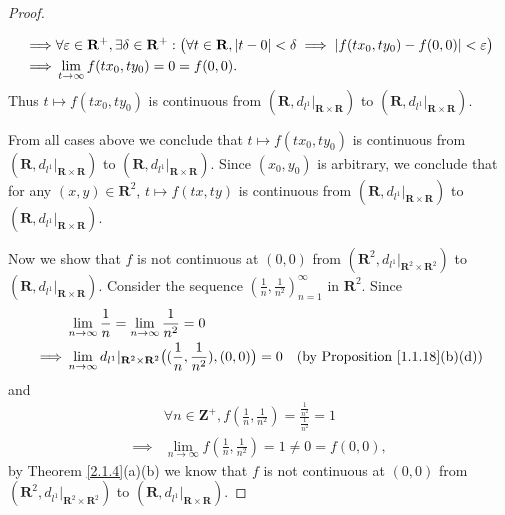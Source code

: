 \begin{proof}
\begin{itemize}
\begin{align*}
                  \implies & \forall \varepsilon \in \mathbf{R}^+, \exists \delta \in \mathbf{R}^+ : \big(\forall t \in \mathbf{R}, \abs*{t - 0} < \delta \implies \abs*{f(t x_0, t y_0) - f(0, 0)} < \varepsilon\big) \\
                  \implies & \lim_{t \to \infty} f(t x_0, t y_0) = 0 = f(0, 0).
              \end{align*}
              Thus \(t \mapsto f(t x_0, t y_0)\) is continuous from \((\mathbf{R}, d_{l^1}|_{\mathbf{R} \times \mathbf{R}})\) to \((\mathbf{R}, d_{l^1}|_{\mathbf{R} \times \mathbf{R}})\).
    \end{itemize}
    From all cases above we conclude that \(t \mapsto f(t x_0, t y_0)\) is  continuous from \((\mathbf{R}, d_{l^1}|_{\mathbf{R} \times \mathbf{R}})\) to \((\mathbf{R}, d_{l^1}|_{\mathbf{R} \times \mathbf{R}})\).
    Since \((x_0, y_0)\) is arbitrary, we conclude that for any \((x, y) \in \mathbf{R}^2\), \(t \mapsto f(tx, ty)\) is continuous from \((\mathbf{R}, d_{l^1}|_{\mathbf{R} \times \mathbf{R}})\) to \((\mathbf{R}, d_{l^1}|_{\mathbf{R} \times \mathbf{R}})\).

    Now we show that \(f\) is not continuous at \((0, 0)\) from \((\mathbf{R}^2, d_{l^1}|_{\mathbf{R}^2 \times \mathbf{R}^2})\) to \((\mathbf{R}, d_{l^1}|_{\mathbf{R} \times \mathbf{R}})\).
    Consider the sequence \((\frac{1}{n}, \frac{1}{n^2})_{n = 1}^\infty\) in \(\mathbf{R}^2\).
    Since
    \begin{align*}
                 & \lim_{n \to \infty} \frac{1}{n} = \lim_{n \to \infty} \frac{1}{n^2} = 0                                                                                        \\
        \implies & \lim_{n \to \infty} d_{l^1}|_{\mathbf{R}^2 \times \mathbf{R}^2}\big((\frac{1}{n}, \frac{1}{n^2}), (0, 0)\big) = 0 & \text{(by Proposition \ref{1.1.18}(b)(d))}
    \end{align*}
    and
    \begin{align*}
                 & \forall n \in \mathbf{Z}^+, f(\frac{1}{n}, \frac{1}{n^2}) = \frac{\frac{1}{n^2}}{\frac{1}{n^2}} = 1 \\
        \implies & \lim_{n \to \infty} f(\frac{1}{n}, \frac{1}{n^2}) = 1 \neq 0 = f(0, 0),
    \end{align*}
    by Theorem \ref{2.1.4}(a)(b) we know that \(f\) is not continuous at \((0, 0)\) from \((\mathbf{R}^2, d_{l^1}|_{\mathbf{R}^2 \times \mathbf{R}^2})\) to \((\mathbf{R}, d_{l^1}|_{\mathbf{R} \times \mathbf{R}})\).
\end{proof}